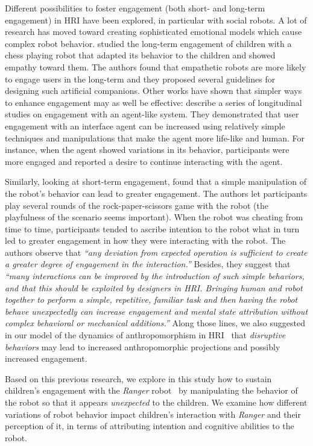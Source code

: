 \documentclass[letterpaper, 10pt, conference]{ieeeconf}
\begin{document}
Different possibilities to foster engagement (both short- and long-term
engagement) in HRI have been explored, in particular with social robots. A lot
of research has moved toward creating sophisticated emotional models which cause
complex robot behavior. \cite{leite_long-term_2013} studied the long-term
engagement of children with a chess playing robot that adapted its behavior to
the children and showed empathy toward them. The authors found that empathetic robots
are more likely to engage users in the long-term and they proposed several
guidelines for designing such artificial companions. Other works
\cite{bickmore_maintaining_2010,short_no_2010} have shown that simpler ways to
enhance engagement may as well be effective: \cite{bickmore_maintaining_2010}
describe a series of longitudinal studies on engagement with an agent-like
system. They demonstrated that user engagement with an interface agent can be
increased using relatively simple techniques and manipulations that make the
agent more life-like and human. For instance, when the agent showed variations
in its behavior, participants were more engaged and reported a desire to
continue interacting with the agent.

Similarly, looking at short-term engagement, \cite{short_no_2010} found that a
simple manipulation of the robot's behavior can lead to greater engagement. The
authors let participants play several rounds of the rock-paper-scissors game
with the robot (the playfulness of the scenario seems important). When the robot
was cheating from time to time, participants tended to ascribe intention to the
robot what in turn led to greater engagement in how they were interacting with
the robot. The authors observe that \textit{``any deviation from expected
operation is sufficient to create a greater degree of engagement in the
interaction.''} Besides, they suggest that \textit{``many interactions can be
improved by the introduction of such simple behaviors, and that this should
be exploited by designers in HRI. Bringing human and robot together to
perform a simple, repetitive, familiar task and then having the robot behave
unexpectedly can increase engagement and mental state attribution without
complex behavioral or mechanical additions.''}  Along those lines, we also
suggested in our model of the dynamics of anthropomorphism in
HRI~\cite{lemaignan2014dynamics} that \emph{disruptive behaviors} may lead to
increased anthropomorphic projections and possibly increased engagement.

Based on this previous research, we explore in this study how to
sustain children's engagement with the \emph{Ranger}
robot~\cite{mondada2014ranger} by manipulating the behavior of the robot so
that it appears \textit{unexpected} to the children. We examine how different
variations of robot behavior impact children's interaction with \emph{Ranger}
and their perception of it, in terms of attributing intention and cognitive
abilities to the robot.
\end{document}
